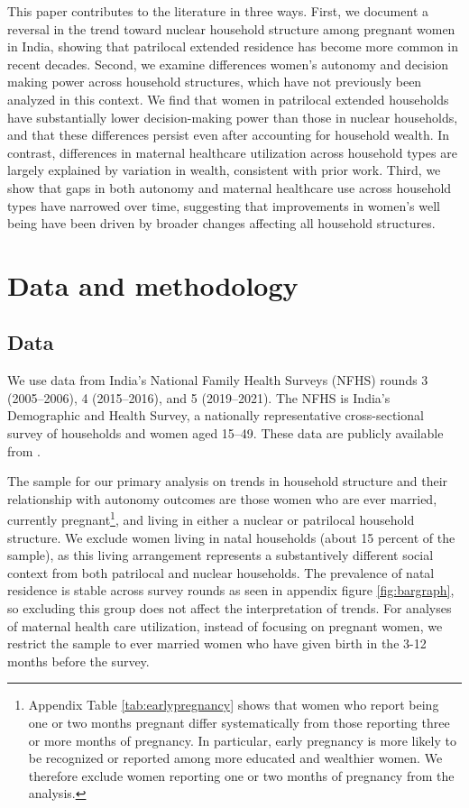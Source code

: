 \documentclass[12pt]{article}
\begin{document}
This paper contributes to the literature in three ways. First, we document a reversal in the trend toward nuclear household structure among pregnant women in India, showing that patrilocal extended residence has become more common in recent decades. Second, we examine differences women’s autonomy and decision making power across household structures, which have not previously been analyzed in this context. We find that women in patrilocal extended households have substantially lower decision-making power than those in nuclear households, and that these differences persist even after accounting for household wealth. In contrast, differences in maternal healthcare utilization across household types are largely explained by variation in wealth, consistent with prior work. Third, we show that gaps in both autonomy and maternal healthcare use across household types have narrowed over time, suggesting that improvements in women’s well being have been driven by broader changes affecting all household structures.

\section{Data and methodology}
\subsection{Data}

We use data from India’s National Family Health Surveys (NFHS) rounds 3 (2005–2006), 4 (2015–2016), and 5 (2019–2021). The NFHS is India’s Demographic and Health Survey, a nationally representative cross-sectional survey of households and women aged 15–49. These data are publicly available from .

The sample for our primary analysis on trends in household structure and their relationship with autonomy outcomes are those women who are ever married, currently pregnant\footnote{Appendix Table \ref{tab:earlypregnancy} shows that women who report being one or two months pregnant differ systematically from those reporting three or more months of pregnancy. In particular, early pregnancy is more likely to be recognized or reported among more educated and wealthier women. We therefore exclude women reporting one or two months of pregnancy from the analysis.}, and living in either a nuclear or patrilocal household structure. We exclude women living in natal households (about 15 percent of the sample), as this living arrangement represents a substantively different social context from both patrilocal and nuclear households. The prevalence of natal residence is stable across survey rounds as seen in appendix figure \ref{fig:bargraph}, so excluding this group does not affect the interpretation of trends. For analyses of maternal health care utilization, instead of focusing on pregnant women, we restrict the sample to ever married women who have given birth in the 3-12 months before the survey.
\end{document}
